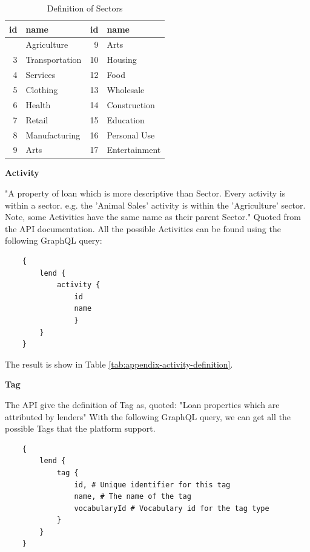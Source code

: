 \begin{longtable}[]{@{}rlrl@{}}
	\caption{Definition of Sectors}
	\label{tab:sector-definition}            \\
	\toprule\noalign{}
	id & name           & id & name          \\
	\midrule\noalign{}
	\endhead
	\bottomrule\noalign{}
	\endlastfoot
	1  & Agriculture    & 9  & Arts          \\
	3  & Transportation & 10 & Housing       \\
	4  & Services       & 12 & Food          \\
	5  & Clothing       & 13 & Wholesale     \\
	6  & Health         & 14 & Construction  \\
	7  & Retail         & 15 & Education     \\
	8  & Manufacturing  & 16 & Personal Use  \\
	9  & Arts           & 17 & Entertainment \\
\end{longtable}

\textbf{Activity}

"A property of loan which is more descriptive than Sector.
Every activity is within a sector. e.g. the 'Animal Sales' activity is within the 'Agriculture' sector.
Note, some Activities have the same name as their parent Sector."
Quoted from the API documentation.
All the possible Activities can be found using the following GraphQL query:

\begin{lstlisting}
    {
        lend {
            activity {
                id
                name
                }	
        }
    }
\end{lstlisting}

The result is show in Table \ref{tab:appendix-activity-definition}.

\textbf{Tag}

The API give the definition of Tag as,
quoted: "Loan properties which are attributed by lenders"
With the following GraphQL query, we can get all the possible Tags that the platform support.

\begin{lstlisting}
    {
        lend {
            tag {
                id, # Unique identifier for this tag
                name, # The name of the tag
                vocabularyId # Vocabulary id for the tag type
            }
        }
    }
\end{lstlisting}


